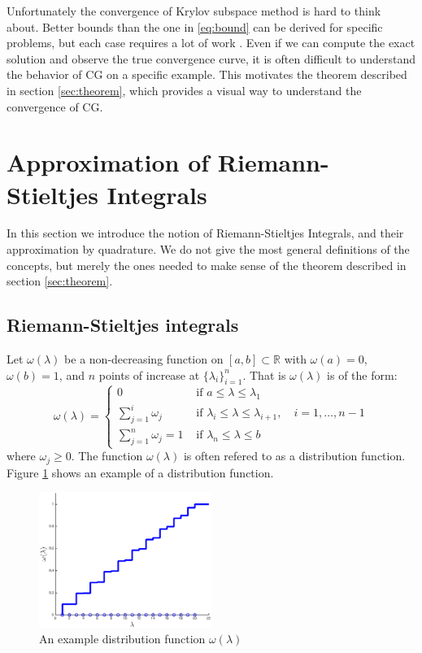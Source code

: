 \documentclass[10pt,a4paper]{article}
\begin{document}
Unfortunately the convergence of Krylov subspace method is hard to think about. Better bounds than the one in \ref{eq:bound} can be derived for specific problems, but each case requires a lot of work  \cite{beckermann2001superlinear,beckermann2002superlinear}. Even if we can compute the exact solution and observe the true convergence curve, it is often difficult to understand the behavior of CG on a specific example. This motivates the theorem described in section \ref{sec:theorem}, which provides a visual way to understand the convergence of CG.

\section{Approximation of Riemann-Stieltjes Integrals} \label{sec:quad}

In this section we introduce the notion of Riemann-Stieltjes Integrals, and their approximation by quadrature. We do not give the most general definitions of the concepts, but merely the ones needed to make sense of the theorem described in section \ref{sec:theorem}.
\subsection{Riemann-Stieltjes integrals}
Let $\omega(\lambda)$ be a non-decreasing function on $\left[ a , b \right] \subset \mathbb{R}$ with $\omega(a) =0$, $\omega(b) =1$, and  $n$ points of increase at $\{ \lambda_i \}_{i=1}^n $. That is $\omega(\lambda)$ is of the form:
\begin{equation} 
\omega(\lambda) = \begin{cases}
0 & \text{ if } a \leq \lambda \leq \lambda_1   \\
\sum_{j=1}^i \omega_j & \text{ if } \lambda_i \leq \lambda \leq \lambda_{i+1},   \quad i = 1,\dots,n-1   \\
\sum_{j=1}^n \omega_j = 1 & \text{ if } \lambda_n \leq \lambda \leq b     
\end{cases}
\end{equation} 
where $\omega_j \geq 0 $. The function $\omega(\lambda)$ is often refered to as a distribution function. Figure \ref{fig:exdist} shows an example of a distribution function.

\begin{figure}[h]
  \centering
\includegraphics[width = 0.5\textwidth]{distrib}
  \caption{An example distribution function $\omega(\lambda)$  \label{fig:exdist}}
\end{figure}
\end{document}
